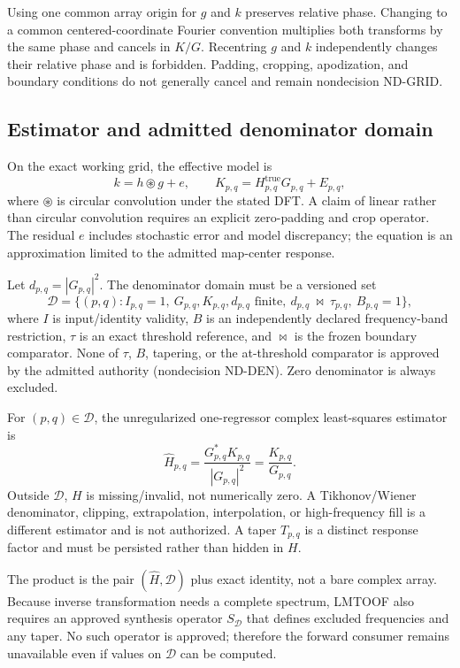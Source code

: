 \documentclass[11pt]{article}
\begin{document}
Using one common array origin for $g$ and $k$ preserves relative phase.
Changing to a common centered-coordinate Fourier convention multiplies both
transforms by the same phase and cancels in $K/G$.  Recentring $g$ and $k$
independently changes their relative phase and is forbidden.  Padding,
cropping, apodization, and boundary conditions do not generally cancel and
remain nondecision ND-GRID.

\subsection{Estimator and admitted denominator domain}

On the exact working grid, the effective model is
\[
 k=h\circledast g+e,
 \qquad K_{p,q}=H^{\mathrm{true}}_{p,q}G_{p,q}+E_{p,q},
\]
where $\circledast$ is circular convolution under the stated DFT.  A claim of
linear rather than circular convolution requires an explicit zero-padding and
crop operator.  The residual $e$ includes stochastic error and model
discrepancy; the equation is an approximation limited to the admitted
map-center response.

Let $d_{p,q}=|G_{p,q}|^2$.  The denominator domain must be a versioned set
\[
 \mathcal D=\{(p,q): I_{p,q}=1,\ G_{p,q},K_{p,q},d_{p,q}\text{ finite},
 \ d_{p,q}\ \bowtie\ \tau_{p,q},\ B_{p,q}=1\},
\]
where $I$ is input/identity validity, $B$ is an independently declared
frequency-band restriction, $\tau$ is an exact threshold reference, and
$\bowtie$ is the frozen boundary comparator.  None of $\tau$, $B$, tapering,
or the at-threshold comparator is approved by the admitted authority
(nondecision ND-DEN).  Zero denominator is always excluded.

For $(p,q)\in\mathcal D$, the unregularized one-regressor complex
least-squares estimator is
\begin{equation}
 \widehat H_{p,q}
 =\frac{G_{p,q}^{*}K_{p,q}}{|G_{p,q}|^2}
 =\frac{K_{p,q}}{G_{p,q}}.
 \label{eq:estimator}
\end{equation}
Outside $\mathcal D$, $H$ is missing/invalid, not numerically zero.  A
Tikhonov/Wiener denominator, clipping, extrapolation, interpolation, or
high-frequency fill is a different estimator and is not authorized.  A taper
$T_{p,q}$ is a distinct response factor and must be persisted rather than
hidden in $H$.

The product is the pair $(\widehat H,\mathcal D)$ plus exact identity, not a
bare complex array.  Because inverse transformation needs a complete spectrum,
LMTOOF also requires an approved synthesis operator $S_{\mathcal D}$ that
defines excluded frequencies and any taper.  No such operator is approved;
therefore the forward consumer remains unavailable even if values on
$\mathcal D$ can be computed.
\end{document}
